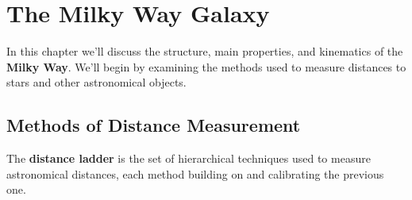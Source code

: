 \chapter{The Milky Way Galaxy}

\vspace{-0.5em}

In this chapter we'll discuss the structure, main properties, and kinematics of the \textbf{Milky Way}. We'll begin by examining the methods used to measure distances to stars and other astronomical objects.

\vspace{-0.3em}

\section{Methods of Distance Measurement}

\vspace{-0.3em}

The \textbf{distance ladder} is the set of hierarchical techniques used to measure astronomical distances, each method building on and calibrating the previous one.

